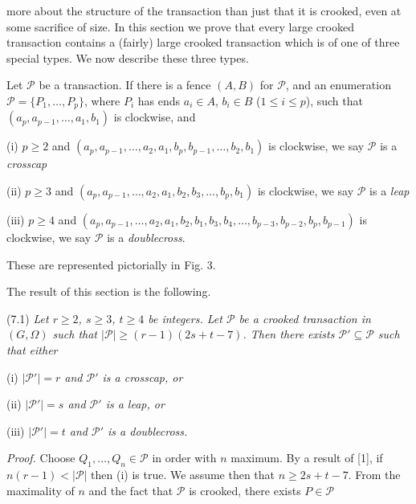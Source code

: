 \noindent more about the structure of the transaction than just that it is crooked, even at some sacrifice of size. In this section we prove that every large crooked transaction contains a (fairly) large crooked transaction which is of one of three special types. We now describe these three types.

Let $\mathcal{P}$ be a transaction. If there is a fence $(A, B)$ for $\mathcal{P}$, and an enumeration $\mathcal{P} = \{P_1, \dots, P_p\}$, where $P_i$ has ends $a_i \in A$, $b_i \in B$ ($1 \le i \le p$), such that $(a_p, a_{p-1}, \dots, a_1, b_1)$ is clockwise, and

\hspace*{12pt}(i) $p \ge 2$ and $(a_p, a_{p-1}, \dots, a_2, a_1, b_p, b_{p-1}, \dots, b_2, b_1)$ is clockwise, we say $\mathcal{P}$ is a \textit{crosscap}

\hspace*{12pt}(ii) $p \ge 3$ and $(a_p, a_{p-1}, \dots, a_2, a_1, b_2, b_3, \dots, b_p, b_1)$ is clockwise, we say $\mathcal{P}$ is a \textit{leap}

\hspace*{12pt}(iii) $p \ge 4$ and $(a_p, a_{p-1}, \dots, a_2, a_1, b_2, b_1, b_3, b_4, \dots, b_{p-3}, b_{p-2}, b_p, b_{p-1})$ is clockwise, we say $\mathcal{P}$ is a \textit{doublecross}.

These are represented pictorially in Fig. 3.

The result of this section is the following.

\stmt
(7.1) \textit{Let $r \ge 2$, $s \ge 3$, $t \ge 4$ be integers. Let $\mathcal{P}$ be a crooked transaction in $(G, \Omega)$ such that $|\mathcal{P}| \ge (r - 1)(2s + t - 7)$. Then there exists $\mathcal{P}' \subseteq \mathcal{P}$ such that either}

\hspace*{12pt}(i) \textit{$|\mathcal{P}'| = r$ and $\mathcal{P}'$ is a crosscap, or}

\hspace*{12pt}(ii) \textit{$|\mathcal{P}'| = s$ and $\mathcal{P}'$ is a leap, or}

\hspace*{12pt}(iii) \textit{$|\mathcal{P}'| = t$ and $\mathcal{P}'$ is a doublecross.}

\textit{Proof.} Choose $Q_1, \dots, Q_n \in \mathcal{P}$ in order with $n$ maximum. By a result of [1], if $n(r - 1) < |\mathcal{P}|$ then (i) is true. We assume then that $n \ge 2s + t - 7$. From the maximality of $n$ and the fact that $\mathcal{P}$ is crooked, there exists $P \in \mathcal{P}$

